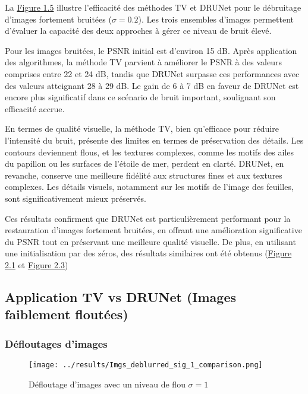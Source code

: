 \documentclass[a4paper, 12pt]{report} %
\begin{document}
La \hyperref[fig:5]{Figure 1.5} illustre l’efficacité des méthodes TV et DRUNet pour le débruitage d’images fortement bruitées (\(\sigma = 0.2\)). Les trois ensembles d’images permettent d’évaluer la capacité des deux approches à gérer ce niveau de bruit élevé.

Pour les images bruitées, le PSNR initial est d’environ 15 dB. Après application des algorithmes, la méthode TV parvient à améliorer le PSNR à des valeurs comprises entre 22 et 24 dB, tandis que DRUNet surpasse ces performances avec des valeurs atteignant 28 à 29 dB. Le gain de 6 à 7 dB en faveur de DRUNet est encore plus significatif dans ce scénario de bruit important, soulignant son efficacité accrue.

En termes de qualité visuelle, la méthode TV, bien qu'efficace pour réduire l'intensité du bruit, présente des limites en termes de préservation des détails. Les contours deviennent flous, et les textures complexes, comme les motifs des ailes du papillon ou les surfaces de l’étoile de mer, perdent en clarté. DRUNet, en revanche, conserve une meilleure fidélité aux structures fines et aux textures complexes. Les détails visuels, notamment sur les motifs de l'image des feuilles, sont significativement mieux préservés.

Ces résultats confirment que DRUNet est particulièrement performant pour la restauration d'images fortement bruitées, en offrant une amélioration significative du PSNR tout en préservant une meilleure qualité visuelle. De plus, en utilisant une initialisation par des zéros, des résultats similaires ont été obtenus (\hyperref[fig:12]{Figure 2.1} et \hyperref[fig:14]{Figure 2.3})

\subsection{Application TV vs DRUNet (Images faiblement floutées)}

\subsubsection{Défloutages d'images}

\begin{figure}[H]
\centering
\begin{adjustbox}{width=0.985\linewidth, totalheight=0.47 \textheight, angle=0, scale= 0.9, minipage= 4.2\linewidth, margin= 0}
    \texttt{[image: ../results/Imgs\_deblurred\_sig\_1\_comparison.png]}
\end{adjustbox}
    \caption{ Défloutage d'images avec un niveau de flou $\sigma = 1$}
    \label{fig:6}
\end{figure} 
\end{document}

